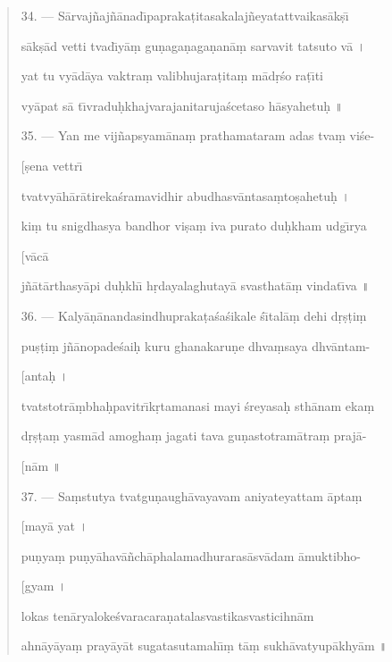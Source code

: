 \documentclass[a4paper, 11pt, oneside, french]{article}
\begin{document}
\begin{quotation}
34. --- S\={a}rvaj\~{n}aj\~{n}\={a}nad\={\i}papraka\d{t}itasakalaj\~{n}eyatattvaikas\={a}k\d{s}\={\i}

s\={a}k\d{s}\={a}d vetti tvad\={\i}y\={a}\d{m} gu\d{n}aga\d{n}aga\d{n}an\={a}\d{m} sarvavit tatsuto v\={a} \texthindi{।}

yat tu vy\={a}d\={a}ya vaktra\d{m} valibhujara\d{t}ita\d{m} m\={a}d\d{r}\'{s}o ra\d{t}\={\i}ti

vy\={a}pat s\={a} t\={\i}vradu\d{h}khajvarajanitaruja\'{s}cetaso h\={a}syahetu\d{h} \texthindi{॥}

\bigskip

35. --- Yan me vij\~{n}apsyam\={a}na\d{m} prathamataram adas tva\d{m} vi\'{s}e-

\hspace*{85mm}[\d{s}ena vettr\={\i}

tvatvy\={a}h\={a}r\={a}tireka\'{s}ramavidhir abudhasv\={a}ntasa\d{m}to\d{s}ahetu\d{h} \texthindi{।}

ki\d{m} tu snigdhasya bandhor vi\d{s}a\d{m} iva purato du\d{h}kham udg\={\i}rya

\hspace*{85mm}[v\={a}c\={a}

j\~{n}\={a}t\={a}rthasy\={a}pi du\d{h}kh\={\i} h\d{r}dayalaghutay\={a} svasthat\={a}\d{m} vindat\={\i}va \texthindi{॥}

\bigskip

36. --- Kaly\={a}\d{n}\={a}nandasindhupraka\d{t}a\'{s}a\'{s}ikale \'{s}\={\i}tal\={a}\d{m} dehi d\d{r}\d{s}\d{t}i\d{m}

pu\d{s}\d{t}i\d{m} j\~{n}\={a}nopade\'{s}ai\d{h} kuru ghanakaru\d{n}e dhva\d{m}saya dhv\={a}ntam-

\hspace*{85mm}[anta\d{h} \texthindi{।}

tvatstotr\={a}\d{m}bha\d{h}pavitr\={\i}k\d{r}tamanasi mayi \'{s}reyasa\d{h} sth\={a}nam eka\d{m}

d\d{r}\d{s}\d{t}a\d{m} yasm\={a}d amogha\d{m} jagati tava gu\d{n}astotram\={a}tra\d{m} praj\={a}-

\hspace*{85mm}[n\={a}m \texthindi{॥}

\bigskip

37. --- Sa\d{m}stutya tvatgu\d{n}augh\={a}vayavam aniyateyattam \={a}pta\d{m}

\hspace*{85mm}[may\={a} yat \texthindi{।}

pu\d{n}ya\d{m} pu\d{n}y\={a}hav\={a}\~{n}ch\={a}phalamadhuraras\={a}sv\={a}dam \={a}muktibho-

\hspace*{85mm}[gyam \texthindi{।}

lokas ten\={a}ryaloke\'{s}varacara\d{n}atalasvastikasvasticihn\={a}m

ahn\={a}y\={a}ya\d{m} pray\={a}y\={a}t sugatasutamah\={\i}\d{m} t\={a}\d{m} sukh\={a}vatyup\={a}khy\={a}m \texthindi{॥}
\end{quotation}
\clearpage
\end{document}
